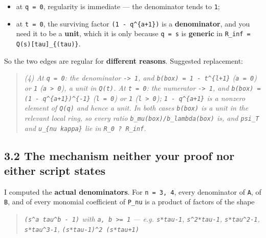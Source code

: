 \documentclass[11pt,a4paper]{article}
\begin{document}
\begin{itemize}
\item at \mbox{\texttt{q = 0}}, regularity is immediate --- the denominator tends to \mbox{\texttt{1}};
\item at \mbox{\texttt{t = 0}}, the surviving factor \mbox{\texttt{(1 - q\textasciicircum{}\{a+1\})}} is a \textbf{denominator}, and you need it to be a \textbf{unit}, which it is only because \mbox{\texttt{q = s}} is \textbf{generic} in \mbox{\texttt{R\_inf = Q(s)[tau]\_\{(tau)\}}}.
\end{itemize}

So the two edges are regular for \textbf{different reasons}. Suggested replacement:

\begin{quote}\itshape (4) At \mbox{\texttt{q = 0}}: the denominator \mbox{\texttt{-> 1}}, and \mbox{\texttt{b(box) = 1 - t\textasciicircum{}\{l+1\}}} (\mbox{\texttt{a = 0}}) or \mbox{\texttt{1}} (\mbox{\texttt{a > 0}}), a unit in \mbox{\texttt{Q(t)}}. At \mbox{\texttt{t = 0}}: the numerator \mbox{\texttt{-> 1}}, and \mbox{\texttt{b(box) = (1 - q\textasciicircum{}\{a+1\})\textasciicircum{}\{-1\}}} (\mbox{\texttt{l = 0}}) or \mbox{\texttt{1}} (\mbox{\texttt{l > 0}}); \mbox{\texttt{1 - q\textasciicircum{}\{a+1\}}} is a nonzero element of \mbox{\texttt{Q(q)}} and hence a unit. In both cases \mbox{\texttt{b(box)}} is a unit in the relevant local ring, so every ratio \mbox{\texttt{b\_mu(box)/b\_lambda(box)}} is, and \mbox{\texttt{psi\_T}} and \mbox{\texttt{u\_\{nu kappa\}}} lie in \mbox{\texttt{R\_0 ? R\_inf}}.\end{quote}

\subsection*{3.2 The mechanism neither your proof nor either script states}

I computed the \textbf{actual denominators}. For \mbox{\texttt{n = 3, 4}}, every denominator of \mbox{\texttt{A}}, of \mbox{\texttt{B}}, and of every monomial coefficient of \mbox{\texttt{P\_nu}} is a product of factors of the shape

\begin{quote}\itshape \mbox{\texttt{(s\textasciicircum{}a tau\textasciicircum{}b - 1)}} with \mbox{\texttt{a, b >= 1}} --- e.g. \mbox{\texttt{s*tau-1}}, \mbox{\texttt{s\textasciicircum{}2*tau-1}}, \mbox{\texttt{s*tau\textasciicircum{}2-1}}, \mbox{\texttt{s*tau\textasciicircum{}3-1}}, \mbox{\texttt{(s*tau-1)\textasciicircum{}2 (s*tau+1)}}\end{quote}
\end{document}
